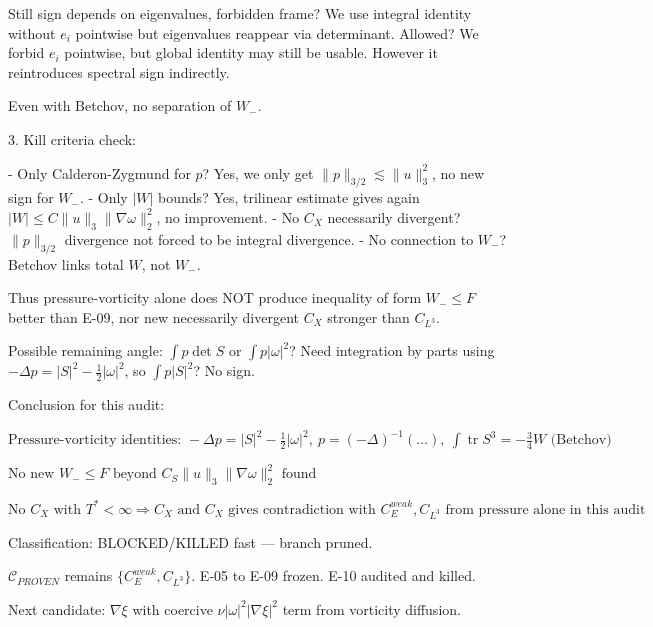 \documentclass[11pt]{article}
\begin{document}
Still sign depends on eigenvalues, forbidden frame? We use integral identity without $e_i$ pointwise but eigenvalues reappear via determinant. Allowed? We forbid $e_i$ pointwise, but global identity may still be usable. However it reintroduces spectral sign indirectly.

Even with Betchov, no separation of $W_-$.

3. Kill criteria check:

- Only Calderon-Zygmund for $p$? Yes, we only get $\|p\|_{3/2}\lesssim\|u\|_3^2$, no new sign for $W_-$.
- Only $|W|$ bounds? Yes, trilinear estimate gives again $|W|\le C\|u\|_3\|\nabla\omega\|_2^2$, no improvement.
- No $C_X$ necessarily divergent? $\|p\|_{3/2}$ divergence not forced to be integral divergence.
- No connection to $W_-$? Betchov links total $W$, not $W_-$.

Thus pressure-vorticity alone does NOT produce inequality of form $W_-\le F$ better than E-09, nor new necessarily divergent $C_X$ stronger than $C_{L^3}$.

Possible remaining angle: $\int p \det S$ or $\int p |\omega|^2$? Need integration by parts using $-\Delta p = |S|^2-\frac12|\omega|^2$, so $\int p|S|^2$? No sign.

Conclusion for this audit:

$\boxed{\text{Pressure-vorticity identities: }-\Delta p=|S|^2-\frac12|\omega|^2,\ p=(-\Delta)^{-1}(\dots),\ \int\operatorname{tr}S^3=-\frac34 W\text{ (Betchov)}}$

$\boxed{\text{No new }W_-\le F\text{ beyond }C_S\|u\|_3\|\nabla\omega\|_2^2\text{ found}}$

$\boxed{\text{No }C_X\text{ with }T^*<\infty\Rightarrow C_X\text{ and }C_X\text{ gives contradiction with }C_E^{weak},C_{L^3}\text{ from pressure alone in this audit}}$

Classification: BLOCKED/KILLED fast — branch pruned.

$\mathcal{C}_{PROVEN}$ remains $\{C_E^{weak},C_{L^3}\}$. E-05 to E-09 frozen. E-10 audited and killed.

Next candidate: $\nabla\xi$ with coercive $\nu|\omega|^2|\nabla\xi|^2$ term from vorticity diffusion.
\end{document}
